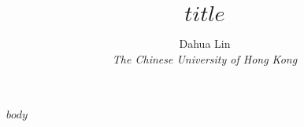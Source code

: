 \documentclass[a4paper,11pt]{article}
\begin{document}
\title{\bf $title$}
\author{Dahua Lin \\ \textit{The Chinese University of Hong Kong}}
\date{}
\maketitle

$body$
\end{document}

